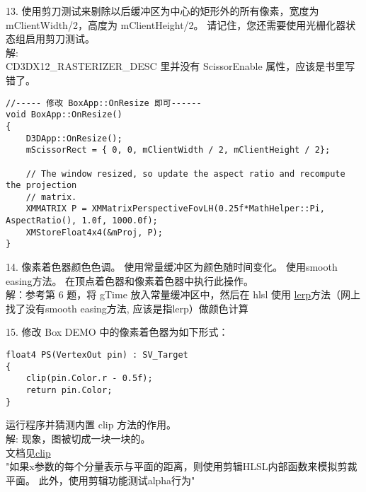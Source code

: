 \begin{flushleft}
13. 使用剪刀测试来剔除以后缓冲区为中心的矩形外的所有像素，宽度为mClientWidth/2，高度为 mClientHeight/2。 请记住，您还需要使用光栅化器状态组启用剪刀测试。\\
解:\\
CD3DX12\_RASTERIZER\_DESC 里并没有 ScissorEnable 属性，应该是书里写错了。
\end{flushleft}
\begin{lstlisting}
//----- 修改 BoxApp::OnResize 即可------
void BoxApp::OnResize()
{
    D3DApp::OnResize();
    mScissorRect = { 0, 0, mClientWidth / 2, mClientHeight / 2};

    // The window resized, so update the aspect ratio and recompute the projection
    // matrix.
    XMMATRIX P = XMMatrixPerspectiveFovLH(0.25f*MathHelper::Pi, AspectRatio(), 1.0f, 1000.0f);
    XMStoreFloat4x4(&mProj, P);
}
\end{lstlisting}

\begin{flushleft}
14. 像素着色器颜色色调。 使用常量缓冲区为颜色随时间变化。 使用smooth easing方法。 在顶点着色器和像素着色器中执行此操作。\\
解：参考第 6 题，将 gTime 放入常量缓冲区中，然后在 hlsl 使用 \href{https://docs.microsoft.com/en-us/windows/desktop/direct3dhlsl/dx-graphics-hlsl-lerp}{\textcolor{linkColor}{lerp}}方法（网上找了没有smooth easing方法, 应该是指lerp）做颜色计算
\end{flushleft}

\begin{flushleft}
15. 修改 Box DEMO 中的像素着色器为如下形式：
\end{flushleft}
\begin{lstlisting}
float4 PS(VertexOut pin) : SV_Target
{
    clip(pin.Color.r - 0.5f);
    return pin.Color;
}
\end{lstlisting}
\begin{flushleft}
运行程序并猜测内置 clip 方法的作用。\\
解: 现象，图被切成一块一块的。\\
文档见\href{https://docs.microsoft.com/en-us/windows/desktop/direct3dhlsl/dx-graphics-hlsl-clip}{\textcolor{linkColor}{clip}}\\
"如果x参数的每个分量表示与平面的距离，则使用剪辑HLSL内部函数来模拟剪裁平面。
此外，使用剪辑功能测试alpha行为"
\end{flushleft}

